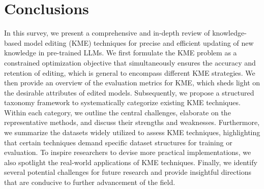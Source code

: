 \documentclass[acmsmall, screen]{acmart}
\begin{document}



\section{Conclusions}\label{sec:conclusion}
In this survey, we present a comprehensive and in-depth review of knowledge-based model editing (KME) techniques for precise and efficient updating of new knowledge in pre-trained LLMs. We first formulate the KME problem as a constrained optimization objective that simultaneously ensures the accuracy and retention of editing, which is general to encompass different KME strategies. We then provide an overview of the evaluation metrics for KME, which sheds light on the desirable attributes of edited models. Subsequently, we propose a structured taxonomy framework to systematically categorize existing KME techniques. Within each category, we outline the central challenges, elaborate on the %
representative methods, and discuss their strengths and weaknesses. Furthermore, we summarize the datasets widely utilized to assess KME techniques, highlighting that certain techniques demand specific dataset structures for training or evaluation. To inspire researchers to devise more practical implementations, we also spotlight the real-world applications of KME techniques. Finally, we identify several potential challenges for future research and provide insightful directions that are conducive to further advancement of the field.
\end{document}
